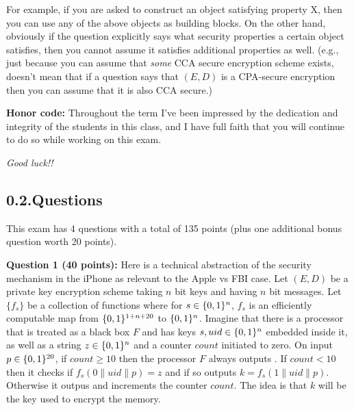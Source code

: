 \documentclass{article}
\begin{document}
\noindent{}For example, if you are asked to construct an object satisfying property X, then you can use any of the above objects as building blocks.
On the other hand, obviously if the question explicitly says what security properties a certain object satisfies, then you cannot assume it satisfies additional properties as well.
(e.g., just because you can assume that \emph{some} CCA secure encryption scheme exists, doesn't mean that if a question says that $(E,D)$ is a CPA-secure encryption then you can assume that it is also CCA secure.)%

\textbf{Honor code:} Throughout the term I've been impressed by the dedication and integrity of the students in this class, and I have full faith that you will continue to do so while working on this exam.%

\emph{Good luck!!}%

\subsection{0.2.\hspace*{0.5em}Questions}\label{sec-questions}%

\noindent{}This exam has 4 questions with a total of 135 points (plus one additional bonus question worth 20 points).%

\textbf{Question 1 (40 points):} Here is a technical abstraction of the security mechanism in the iPhone as relevant to the Apple vs FBI case.  Let $(E,D)$ be a private key encryption scheme taking $n$ bit keys and having $n$ bit messages. Let $\{ f_s \}$ be a collection of functions where for $s\in\{0,1\}^n$, $f_s$ is an efficiently computable map from $\{0,1\}^{1+n+20}$ to $\{0,1\}^n$.
Imagine that there is a processor that is treated as a black box $F$ and has keys $s, uid \in \{0,1\}^n$ embedded inside it, as well as a string $z\in\{0,1\}^n$ and a counter $count$ initiated to zero.
On input $p\in\{0,1\}^{20}$, if $count \geq 10$ then the processor $F$ always outputs . If $count<10$ then it checks if $f_s(0\|uid\|p)=z$ and if so outputs $k=f_s(1\|uid\|p)$. Otherwise it outpus  and increments the counter $count$.
The idea is that $k$ will be the key used to encrypt the memory.%
\end{document}
